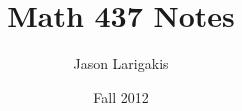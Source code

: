 \documentclass[titlepage,twoside]{article}
\title{Math 437 Notes}
\author{Jason Larigakis}
\date{Fall 2012}
\begin{document}
\maketitle{}
\tableofcontents{}
\clearpage


\end{document}
